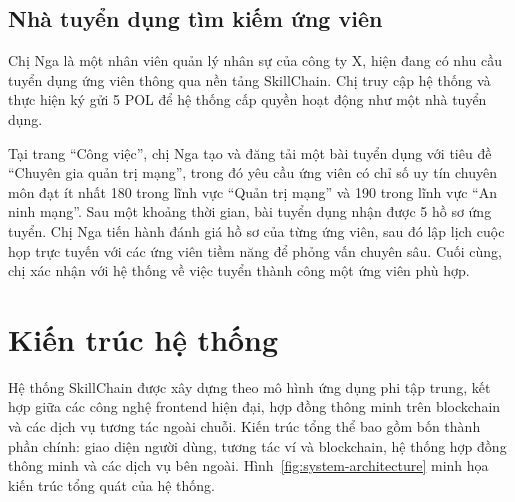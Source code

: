 \subsection{Nhà tuyển dụng tìm kiếm ứng viên}

Chị Nga là một nhân viên quản lý nhân sự của công ty X, hiện đang có nhu cầu tuyển dụng ứng viên thông qua nền tảng SkillChain.
Chị truy cập hệ thống và thực hiện ký gửi 5 POL để hệ thống cấp quyền hoạt động như một nhà tuyển dụng.

Tại trang ``Công việc'', chị Nga tạo và đăng tải một bài tuyển dụng với tiêu đề ``Chuyên gia quản trị mạng'', trong đó yêu cầu ứng viên có chỉ số uy tín chuyên môn đạt ít nhất 180 trong lĩnh vực ``Quản trị mạng'' và 190 trong lĩnh vực ``An ninh mạng''.
Sau một khoảng thời gian, bài tuyển dụng nhận được 5 hồ sơ ứng tuyển. Chị Nga tiến hành đánh giá hồ sơ của từng ứng viên, sau đó lập lịch cuộc họp trực tuyến với các ứng viên tiềm năng để phỏng vấn chuyên sâu.
Cuối cùng, chị xác nhận với hệ thống về việc tuyển thành công một ứng viên phù hợp.

\section{Kiến trúc hệ thống}

Hệ thống SkillChain được xây dựng theo mô hình ứng dụng phi tập trung, kết hợp giữa các công nghệ frontend hiện đại, hợp đồng thông minh trên blockchain và các dịch vụ tương tác ngoài chuỗi.
Kiến trúc tổng thể bao gồm bốn thành phần chính: giao diện người dùng, tương tác ví và blockchain, hệ thống hợp đồng thông minh và các dịch vụ bên ngoài.
Hình~\ref{fig:system-architecture} minh họa kiến trúc tổng quát của hệ thống.

